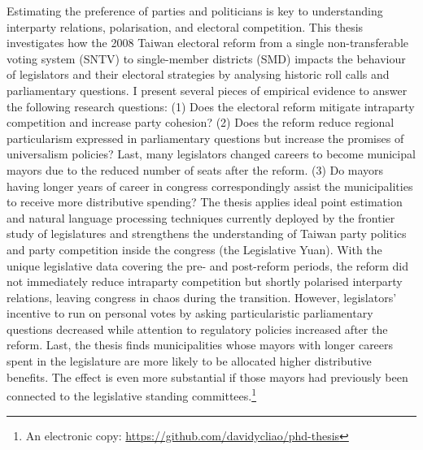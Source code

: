 \small Estimating the preference of parties and politicians is key to understanding interparty relations, polarisation, and electoral competition. This thesis investigates how the 2008 Taiwan electoral reform from a single non-transferable voting system (SNTV) to single-member districts (SMD) impacts the behaviour of legislators and their electoral strategies by analysing historic roll calls and parliamentary questions. I present several pieces of empirical evidence to answer the following research questions: (1) Does the electoral reform mitigate intraparty competition and increase party cohesion? (2) Does the reform reduce regional particularism expressed in parliamentary questions but increase the promises of universalism policies? Last, many legislators changed careers to become municipal mayors due to the reduced number of seats after the reform. (3) Do mayors having longer years of career in congress correspondingly assist the municipalities to receive more distributive spending? The thesis applies ideal point estimation and natural language processing techniques currently deployed by the frontier study of legislatures and strengthens the understanding of Taiwan party politics and party competition inside the congress (the Legislative Yuan). With the unique legislative data covering the pre- and post-reform periods, the reform did not immediately reduce intraparty competition but shortly polarised interparty relations, leaving congress in chaos during the transition. However, legislators' incentive to run on personal votes by asking particularistic parliamentary questions decreased while attention to regulatory policies increased after the reform. Last, the thesis finds municipalities whose mayors with longer careers spent in the legislature are more likely to be allocated higher distributive benefits. The effect is even more substantial if those mayors had previously been connected to the legislative standing committees.\footnote{An electronic copy: \href{ https://github.com/davidycliao/phd-thesis}{https://github.com/davidycliao/phd-thesis}}